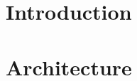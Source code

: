 \documentclass[10pt]{report}
\begin{document}

\restoregeometry

\setcounter{tocdepth}{5}
\tableofcontents
\listoffigures
\listoftables

\justify

\chapter{Introduction}

\pagebreak

\chapter{Architecture}

\pagebreak

\printbibliography
\end{document}
